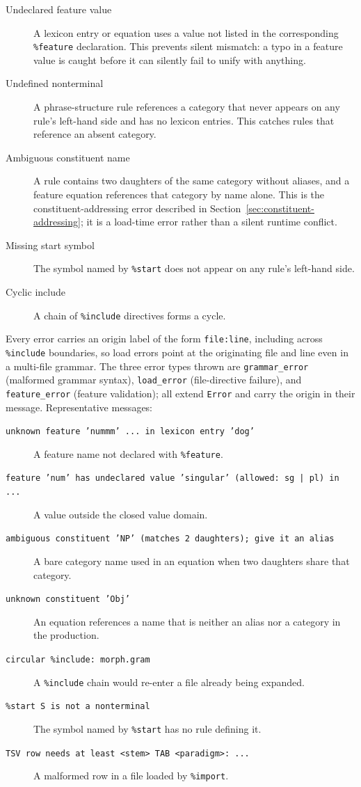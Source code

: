 \documentclass[11pt]{article}
\theoremstyle{definition}
\theoremstyle{plain}
\theoremstyle{remark}
\begin{document}
\begin{description}
  \item[Undeclared feature value] A lexicon entry or equation uses a value not listed in
  the corresponding \texttt{\%feature} declaration. This prevents silent mismatch: a typo
  in a feature value is caught before it can silently fail to unify with anything.

  \item[Undefined nonterminal] A phrase-structure rule references a category that never
  appears on any rule's left-hand side and has no lexicon entries. This catches rules that
  reference an absent category.

  \item[Ambiguous constituent name] A rule contains two daughters of the same category
  without aliases, and a feature equation references that category by name alone. This is
  the constituent-addressing error described in Section~\ref{sec:constituent-addressing};
  it is a load-time error rather than a silent runtime conflict.

  \item[Missing start symbol] The symbol named by \texttt{\%start} does not appear on any
  rule's left-hand side.

  \item[Cyclic include] A chain of \texttt{\%include} directives forms a cycle.
\end{description}

Every error carries an origin label of the form \texttt{file:line}, including across
\texttt{\%include} boundaries, so load errors point at the originating file and line even
in a multi-file grammar. The three error types thrown are \texttt{grammar\_error}
(malformed grammar syntax), \texttt{load\_error} (file-directive failure), and
\texttt{feature\_error} (feature validation); all extend \texttt{Error} and carry the
origin in their message. Representative messages:
\begin{description}
  \item[\texttt{unknown feature 'nummm' ... in lexicon entry 'dog'}]
  A feature name not declared with \texttt{\%feature}.
  \item[\texttt{feature 'num' has undeclared value 'singular' (allowed: sg | pl) in ...}]
  A value outside the closed value domain.
  \item[\texttt{ambiguous constituent 'NP' (matches 2 daughters); give it an alias}]
  A bare category name used in an equation when two daughters share that category.
  \item[\texttt{unknown constituent 'Obj'}]
  An equation references a name that is neither an alias nor a category in the production.
  \item[\texttt{circular \%include: morph.gram}]
  A \texttt{\%include} chain would re-enter a file already being expanded.
  \item[\texttt{\%start S is not a nonterminal}]
  The symbol named by \texttt{\%start} has no rule defining it.
  \item[\texttt{TSV row needs at least <stem> TAB <paradigm>: ...}]
  A malformed row in a file loaded by \texttt{\%import}.
\end{description}
\end{document}
